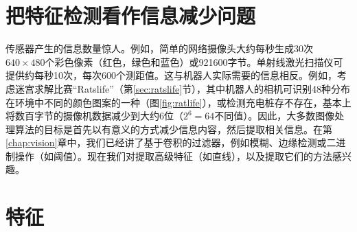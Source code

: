 
\section{把特征检测看作信息减少问题}

传感器产生的信息数量惊人。例如，简单的网络摄像头大约每秒生成30次$640\times 480$个彩色像素（红色，绿色和蓝色）或921600字节。单射线激光扫描仪可提供约每秒10次，每次600个测距值。这与机器人实际需要的信息相反。例如，考虑迷宫求解比赛“Ratslife”（第\ref{sec:ratslife}节），其中机器人的相机可识别48种分布在环境中不同的颜色图案的一种（图\ref{fig:ratlife}），或检测充电桩存不存在，基本上将数百字节的摄像机数据减少到大约6位（$2^6=64$不同值）。因此，大多数图像处理算法的目标是首先以有意义的方式减少信息内容，然后提取相关信息。在第\ref{chap:vision}章中，我们已经讲了基于卷积的过滤器，例如模糊、边缘检测或二进制操作（如阈值）。现在我们对提取高级特征（如直线），以及提取它们的方法感兴趣。


\section{特征}

